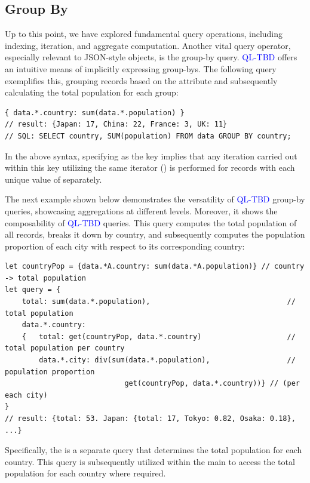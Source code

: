\documentclass[runningheads]{llncs}
\newcommand{\lang}{\textcolor{blue}{QL-TBD}}
\begin{document}
\subsection{Group By}\label{subsec:groupby}
Up to this point, we have explored fundamental query operations, including indexing,
iteration, and aggregate computation.
Another vital query operator, especially relevant to JSON-style objects,
is the group-by query.
\lang{} offers an intuitive means of implicitly expressing group-bys.
The following query exemplifies this, grouping records based on the
 attribute and subsequently calculating the total population
for each group:

\begin{lstlisting}[style=JavaScript, columns=flexible, numbers=none]
{ data.*.country: sum(data.*.population) }
// result: {Japan: 17, China: 22, France: 3, UK: 11}
// SQL: SELECT country, SUM(population) FROM data GROUP BY country;
\end{lstlisting}

In the above syntax, specifying  as the key implies
that any iteration carried out within this key utilizing the same
iterator (\inline{*}) is performed for records with each unique value of 
separately.

The next example shown below demonstrates the versatility of \lang{} group-by queries, showcasing
aggregations at different levels.
Moreover, it shows the composability of \lang{} queries.
This query computes the total population of all records, breaks it down by country,
and subsequently computes the population proportion of each city with respect to its
corresponding country:

\begin{lstlisting}[style=JavaScript, columns=flexible, numbers=none]
let countryPop = {data.*A.country: sum(data.*A.population)} // country -> total population
let query = { 
    total: sum(data.*.population),                                // total population
    data.*.country:
    {   total: get(countryPop, data.*.country)                    // total population per country
        data.*.city: div(sum(data.*.population),                  // population proportion
                            get(countryPop, data.*.country))} // (per each city)
}
// result: {total: 53. Japan: {total: 17, Tokyo: 0.82, Osaka: 0.18}, ...}
\end{lstlisting}

Specifically, the  is a separate query that determines the total
population for each country.
This query is subsequently utilized within the main  to access the
total population for each country where required.
\end{document}
